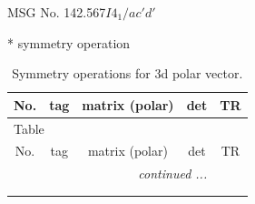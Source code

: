 \documentclass[fleqn,8pt]{jsarticle}
\begin{document}
\setcounter{MaxMatrixCols}{32}

\renewcommand{\tablename}{Table~}
\renewcommand{\figurename}{Figure~}
\begin{center}
\LARGE
MSG No. 142.567\quad$I4_{1}/ac'd'$
\end{center}
* symmetry operation
\renewcommand{\arraystretch}{1.3}
\begin{longtable}{ccccc}
\caption{Symmetry operations for 3d polar vector.}
 \\
 \hline \hline
No. & tag & matrix (polar) & det & TR \\ \hline \endfirsthead

\multicolumn{4}{l}{\tablename\ \thetable{}} \\
 \hline \hline
No. & tag & matrix (polar) & det & TR \\ \hline \endhead

 \hline \hline
\multicolumn{4}{r}{\footnotesize\it continued ...} \\ \endfoot

 \hline \hline
\multicolumn{4}{r}{} \\ \endlastfoot


\end{longtable}
\end{document}
